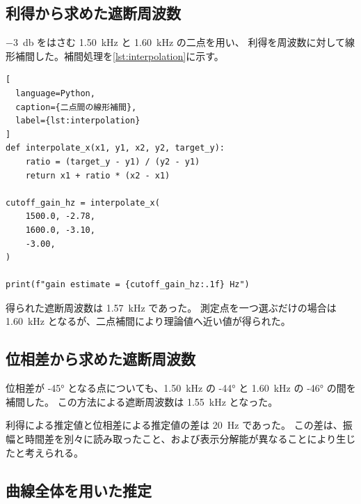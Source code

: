 

\subsection{利得から求めた遮断周波数}
\label{subsec:gain-cutoff}

\qty{-3}{\decibel} をはさむ \qty{1.50}{\kilo\hertz} と \qty{1.60}{\kilo\hertz} の二点を用い、
利得を周波数に対して線形補間した。補間処理を\cref{lst:interpolation}に示す。

\begin{lstlisting}[
  language=Python,
  caption={二点間の線形補間},
  label={lst:interpolation}
]
def interpolate_x(x1, y1, x2, y2, target_y):
    ratio = (target_y - y1) / (y2 - y1)
    return x1 + ratio * (x2 - x1)

cutoff_gain_hz = interpolate_x(
    1500.0, -2.78,
    1600.0, -3.10,
    -3.00,
)

print(f"gain estimate = {cutoff_gain_hz:.1f} Hz")
\end{lstlisting}

得られた遮断周波数は \qty{1.57}{\kilo\hertz} であった。
測定点を一つ選ぶだけの場合は \qty{1.60}{\kilo\hertz} となるが、二点補間により理論値へ近い値が得られた。

\subsection{位相差から求めた遮断周波数}
\label{subsec:phase-cutoff}

位相差が \ang{-45} となる点についても、\qty{1.50}{\kilo\hertz} の
\ang{-44} と \qty{1.60}{\kilo\hertz} の \ang{-46} の間を補間した。
この方法による遮断周波数は \qty{1.55}{\kilo\hertz} となった。

利得による推定値と位相差による推定値の差は \qty{20}{\hertz} であった。
この差は、振幅と時間差を別々に読み取ったこと、および表示分解能が異なることにより生じたと考えられる。

\subsection{曲線全体を用いた推定}
\label{subsec:curve-fit}

